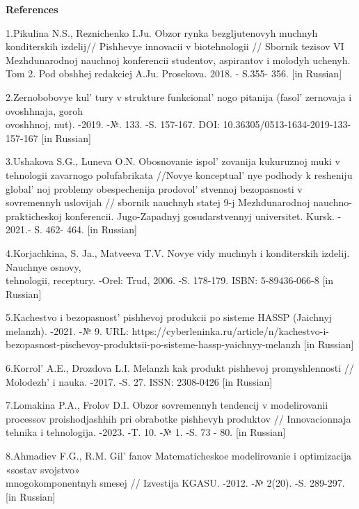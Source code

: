 \begin{center}
{\bfseries References}
\end{center}

\begin{references}
1.Pikulina N.S., Reznichenko I.Ju. Obzor rynka bezgljutenovyh muchnyh
konditerskih izdelij// Pishhevye innovacii v biotehnologii // Sbornik
tezisov VI Mezhdunarodnoj nauchnoj konferencii studentov, aspirantov i
molodyh uchenyh. Tom 2. Pod obshhej redakciej A.Ju. Prosekova. 2018. -
S.355- 356. {[}in Russian{]}

2.Zernobobovye kul' tury v strukture
funkcional' nogo pitanija (fasol'{}
zernovaja i ovoshhnaja, goroh \\ovoshhnoj, nut). -2019. -№. 133. -S. 157-167. DOI: 10.36305/0513-1634-2019-133-157-167 {[}in Russian{]}

3.Ushakova S.G., Luneva O.N. Obosnovanie ispol' zovanija
kukuruznoj muki v tehnologii zavarnogo polufabrikata //Novye
konceptual' nye podhody k resheniju
global' noj problemy obespechenija
prodovol' stvennoj bezopasnosti v sovremennyh uslovijah
// sbornik nauchnyh statej 9-j Mezhdunarodnoj nauchno-prakticheskoj
konferencii. Jugo-Zapadnyj gosudarstvennyj universitet. Kursk. - 2021.-
S. 462- 464. {[}in Russian{]}

4.Korjachkina, S. Ja., Matveeva T.V. Novye vidy muchnyh i konditerskih
izdelij. Nauchnye osnovy, \\tehnologii, receptury. -Orel: Trud, 2006. -S.
178-179. ISBN: 5-89436-066-8 {[}in Russian{]}

5.Kachestvo i bezopasnost'{} pishhevoj produkcii po
sisteme HASSP (Jaichnyj melanzh). -2021. -№ 9. URL:
https://cyberleninka.ru/article/n/kachestvo-i-bezopasnost-pischevoy-produktsii-po-sisteme-hassp-yaichnyy-melanzh
{[}in Russian{]}

6.Korrol'{} A.E., Drozdova L.I. Melanzh kak produkt
pishhevoj promyshlennosti // Molodezh'{} i nauka. -2017.
-S. 27. ISSN: 2308-0426 {[}in Russian{]}

7.Lomakina P.A., Frolov D.I. Obzor sovremennyh tendencij v modelirovanii
processov proishodjashhih pri obrabotke pishhevyh produktov //
Innovacionnaja tehnika i tehnologija. -2023. -T. 10. -№ 1. -S. 73 - 80.
{[}in Russian{]}

8.Ahmadiev F.G., R.M. Gil' fanov Matematicheskoe
modelirovanie i optimizacija «sostav svojstvo» \\mnogokomponentnyh smesej
// Izvestija KGASU. -2012. -№ 2(20). -S. 289-297. {[}in Russian{]}


\end{references}
